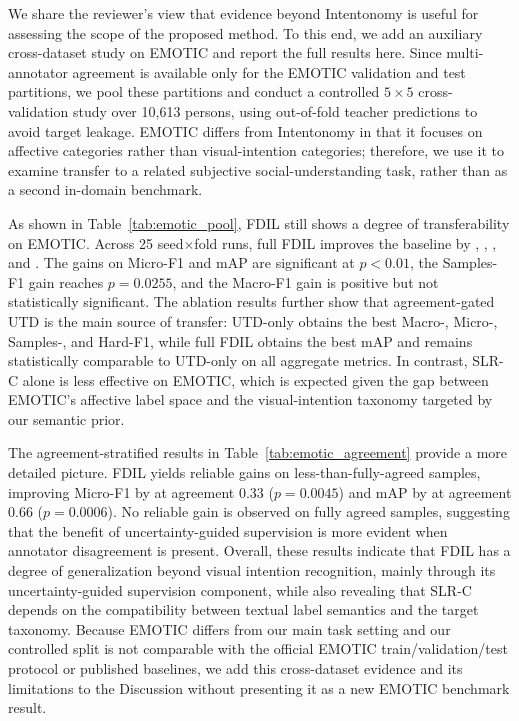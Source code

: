 {We share the reviewer's view that evidence beyond Intentonomy is useful for assessing the scope of the proposed method. To this end, we add an auxiliary cross-dataset study on EMOTIC and report the full results here. Since multi-annotator agreement is available only for the EMOTIC validation and test partitions, we pool these partitions and conduct a controlled $5\times5$ cross-validation study over 10,613 persons, using out-of-fold teacher predictions to avoid target leakage. EMOTIC differs from Intentonomy in that it focuses on affective categories rather than visual-intention categories; therefore, we use it to examine transfer to a related subjective social-understanding task, rather than as a second in-domain benchmark.

As shown in Table~\ref{tab:emotic_pool}, FDIL still shows a degree of transferability on EMOTIC. Across 25 seed$\times$fold runs, full FDIL improves the baseline by , , , and . The gains on Micro-F1 and mAP are significant at $p<0.01$, the Samples-F1 gain reaches $p=0.0255$, and the Macro-F1 gain is positive but not statistically significant. The ablation results further show that agreement-gated UTD is the main source of transfer: UTD-only obtains the best Macro-, Micro-, Samples-, and Hard-F1, while full FDIL obtains the best mAP and remains statistically comparable to UTD-only on all aggregate metrics. In contrast, SLR-C alone is less effective on EMOTIC, which is expected given the gap between EMOTIC's affective label space and the visual-intention taxonomy targeted by our semantic prior.

The agreement-stratified results in Table~\ref{tab:emotic_agreement} provide a more detailed picture. FDIL yields reliable gains on less-than-fully-agreed samples, improving Micro-F1 by  at agreement 0.33 ($p=0.0045$) and mAP by  at agreement 0.66 ($p=0.0006$). No reliable gain is observed on fully agreed samples, suggesting that the benefit of uncertainty-guided supervision is more evident when annotator disagreement is present. Overall, these results indicate that FDIL has a degree of generalization beyond visual intention recognition, mainly through its uncertainty-guided supervision component, while also revealing that SLR-C depends on the compatibility between textual label semantics and the target taxonomy. Because EMOTIC differs from our main task setting and our controlled split is not comparable with the official EMOTIC train/validation/test protocol or published baselines, we add this cross-dataset evidence and its limitations to the Discussion without presenting it as a new EMOTIC benchmark result.


}
